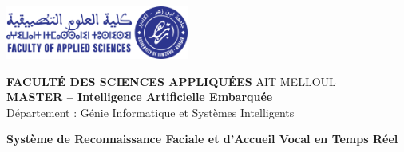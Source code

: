 \documentclass[12pt,a4paper]{article}
\begin{document}
\begin{titlepage}
    \centering
    
    \begin{tcolorbox}[colback=lightgray, colframe=primaryblue, width=0.9\textwidth, arc=5mm, boxrule=2pt]
        \centering
        \vspace{0.5cm}
        
        \begin{center}
           \includegraphics[width=6cm]{FSA_logo.png}
        \end{center}
        
        \vspace{0.5cm}
        
        {\Large\bfseries\color{primaryblue} FACULTÉ DES SCIENCES APPLIQUÉES} {\large\color{primaryblue} AIT MELLOUL} \vspace{0.5cm} \\{\large\bfseries\color{secondaryblue} MASTER – Intelligence Artificielle Embarquée}\\
        {\normalsize\color{darkgray} Département : Génie Informatique et Systèmes Intelligents}
        
        \vspace{0.5cm}
    \end{tcolorbox}
    
    \vspace{2cm}
    
    \begin{tcolorbox}[colback=primaryblue!10, colframe=primaryblue, width=1\textwidth, arc=3mm]
        \centering
        {\Huge\bfseries\color{primaryblue} Système de Reconnaissance Faciale et d'Accueil Vocal en Temps Réel}
    \end{tcolorbox}
    
    \vspace{2cm}
    

\end{titlepage}
\end{document}
